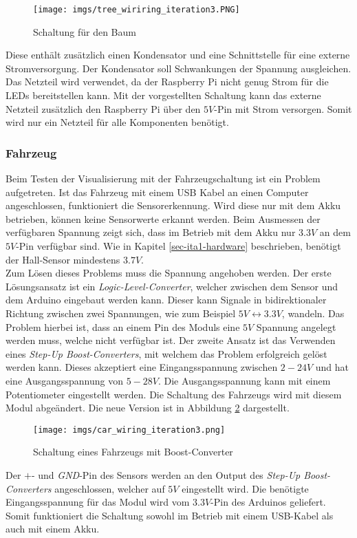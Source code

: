 \documentclass[.../Dokumentation.tex]{subfiles}
\begin{document}
       	\begin{figure}[H]
    	\begin{center}
    		\texttt{[image: imgs/tree\_wiriring\_iteration3.PNG]}
    		\caption{Schaltung für den Baum}
    		\label{fig-tree_iteration3_wiring}
    	\end{center}
    \end{figure}
    \noindent
   	Diese enthält zusätzlich einen Kondensator und eine Schnittstelle für eine externe Stromversorgung. Der Kondensator soll Schwankungen der Spannung ausgleichen. Das Netzteil wird verwendet, da der Raspberry Pi nicht genug Strom für die LEDs bereitstellen kann. Mit der vorgestellten Schaltung kann das externe Netzteil zusätzlich den Raspberry Pi über den $5V$-Pin mit Strom versorgen. Somit wird nur ein Netzteil für alle Komponenten  benötigt.
   	
   	\subsubsection*{Fahrzeug}
   	Beim Testen der Visualisierung mit der Fahrzeugschaltung ist ein Problem aufgetreten. Ist das Fahrzeug mit einem USB Kabel an einen Computer angeschlossen, funktioniert die Sensorerkennung. Wird diese nur mit dem Akku betrieben, können keine Sensorwerte erkannt werden. Beim Ausmessen der verfügbaren Spannung zeigt sich, dass im Betrieb mit dem Akku nur $3.3V$ an dem $5V$-Pin verfügbar sind. Wie in Kapitel \ref{sec-ita1-hardware} beschrieben, benötigt der Hall-Sensor mindestens $3.7V$.\\
   	Zum Lösen dieses Problems muss die Spannung angehoben werden. Der erste Lösungs\-ansatz ist ein \emph{Logic-Level-Converter}, welcher zwischen dem Sensor und dem Arduino eingebaut werden kann. Dieser kann Signale in bidirektionaler Richtung zwischen zwei Spannungen, wie zum Beispiel $5V \longleftrightarrow 3.3V$, wandeln. Das Problem hierbei ist, dass an einem Pin des Moduls eine $5V$ Spannung angelegt werden muss, welche nicht verfügbar ist. Der zweite Ansatz ist das Verwenden eines \textit{Step-Up Boost-Converters}, mit welchem das Problem erfolgreich gelöst werden kann.
   	Dieses akzeptiert eine Eingangsspannung zwischen $2-24V$ und hat eine Ausgangsspannung von $5-28V$. Die Ausgangsspannung kann mit einem Potentiometer eingestellt werden. Die Schaltung des Fahrzeugs wird mit diesem Modul abgeändert. Die neue Version ist in Abbildung \ref{fig-hardware-car-iteration3} dargestellt.
   	\begin{figure}[H]
   		\begin{center}
   			\texttt{[image: imgs/car\_wiring\_iteration3.png]}
   			\caption{Schaltung eines Fahrzeugs mit Boost-Converter}
   			\label{fig-hardware-car-iteration3}
   		\end{center}
   	\end{figure}
   \noindent
   	Der $+$- und \textit{GND}-Pin des Sensors werden an den Output des \textit{Step-Up Boost-Converters} angeschlossen, welcher auf $5V$ eingestellt wird. Die benötigte Eingangsspannung für das Modul wird vom $3.3V$-Pin des Arduinos geliefert. Somit funktioniert die Schaltung sowohl im Betrieb mit einem USB-Kabel als auch mit einem Akku. 
    
    
\end{document}
